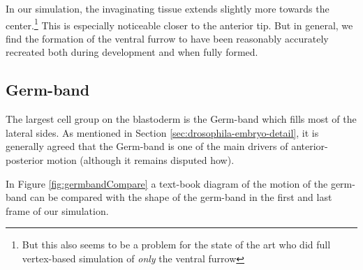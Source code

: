 In our simulation, the invaginating tissue extends slightly more towards the center.\footnote{But this also seems to be a problem for the state of the art  who did full vertex-based simulation of \textit{only} the ventral furrow}  This is especially noticeable closer to the anterior tip.
But in general, we find the formation of the ventral furrow to have been reasonably accurately recreated both during development and when fully formed. 


\subsection{Germ-band}
The largest cell group on the blastoderm is the Germ-band which fills most of the lateral sides. As mentioned in Section \ref{sec:drosophila-embryo-detail}, it is generally agreed that the Germ-band is one of the main drivers of anterior-posterior motion (although it remains disputed how).

In Figure \ref{fig:germbandCompare} a text-book diagram of the motion of the germ-band can be compared with the shape of the germ-band in the first and last frame of our simulation. 

